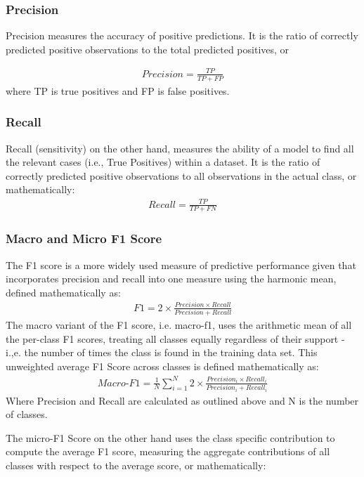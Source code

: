 \documentclass[final]{clv2025}
\begin{document}
\subsubsection{Precision}
Precision measures the accuracy of positive predictions. It is the ratio of correctly predicted positive observations to the total predicted positives, or 

\begin{align*}
    Precision=\frac{TP}{TP+FP}
\end{align*}
where TP is true positives and FP is false positives. 

\subsubsection{Recall}
Recall (sensitivity) on the other hand, measures the ability of a model to find all the relevant cases (i.e., True Positives) within a dataset. It is the ratio of correctly predicted positive observations to all observations in the actual class, or mathematically:
\begin{align*}
    Recall=\frac{TP}{TP+FN}
\end{align*}

\subsubsection{Macro and Micro F1 Score}
The F1 score is a more widely used measure of predictive performance given that incorporates precision and recall into one measure using the harmonic mean, defined mathematically as: 
\begin{align*}
  F1=2\times \frac{Precision\times Recall}{Precision+Recall}  
\end{align*}
The macro variant of the F1 score, i.e. macro-f1, uses the arithmetic mean of all the per-class F1 scores, treating all classes equally regardless of their support - i.,e. the number of times the class is found in the training data set. This unweighted average F1 Score across classes is defined mathematically as:
\begin{align*}
    Macro\text{-}F1=\frac{1}{N }\sum_{i=1}^{N} 2\times \frac{Precision_i\times Recall_i}{Precision_i+Recall_i} 
\end{align*}
Where Precision and Recall are calculated as outlined above and N is the number of classes.

The micro-F1 Score on the other hand uses the class specific contribution to compute the average F1 score, measuring the aggregate contributions of all classes with respect to the average score, or mathematically:
\end{document}
